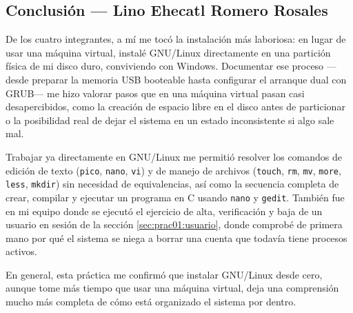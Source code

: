 \subsection{Conclusión — Lino Ehecatl Romero Rosales}
\label{sec:prac01:concl:lino}

De los cuatro integrantes, a mí me tocó la instalación más laboriosa: en lugar de usar una máquina virtual, instalé GNU/Linux directamente en una partición física de mi disco duro, conviviendo con Windows. Documentar ese proceso —desde preparar la memoria USB booteable hasta configurar el arranque dual con GRUB— me hizo valorar pasos que en una máquina virtual pasan casi desapercibidos, como la creación de espacio libre en el disco antes de particionar o la posibilidad real de dejar el sistema en un estado inconsistente si algo sale mal.

Trabajar ya directamente en GNU/Linux me permitió resolver los comandos de edición de texto (\texttt{pico}, \texttt{nano}, \texttt{vi}) y de manejo de archivos (\texttt{touch}, \texttt{rm}, \texttt{mv}, \texttt{more}, \texttt{less}, \texttt{mkdir}) sin necesidad de equivalencias, así como la secuencia completa de crear, compilar y ejecutar un programa en C usando \texttt{nano} y \texttt{gedit}. También fue en mi equipo donde se ejecutó el ejercicio de alta, verificación y baja de un usuario en sesión de la sección \ref{sec:prac01:usuario}, donde comprobé de primera mano por qué el sistema se niega a borrar una cuenta que todavía tiene procesos activos.

En general, esta práctica me confirmó que instalar GNU/Linux desde cero, aunque tome más tiempo que usar una máquina virtual, deja una comprensión mucho más completa de cómo está organizado el sistema por dentro.
